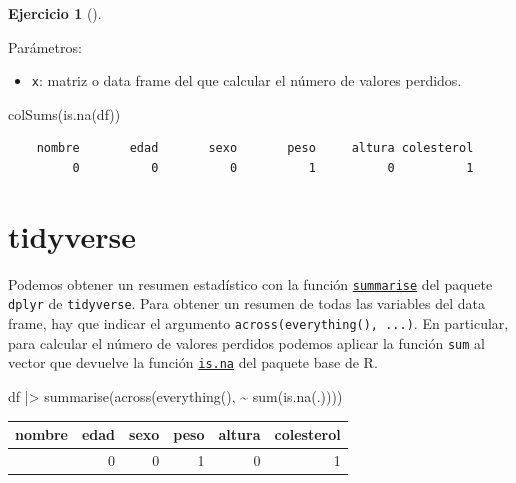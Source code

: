 \documentclass[
  spanish,
  a4paper,
]{scrreport}
\newenvironment{Shaded}{\begin{snugshade}}{\end{snugshade}}
\newcommand{\FunctionTok}[1]{\textcolor[rgb]{0.28,0.35,0.67}{#1}}
\newcommand{\NormalTok}[1]{\textcolor[rgb]{0.00,0.23,0.31}{#1}}
\newcommand{\SpecialCharTok}[1]{\textcolor[rgb]{0.37,0.37,0.37}{#1}}
\providecommand{\tightlist}{%
  \setlength{\itemsep}{0pt}\setlength{\parskip}{0pt}}
\theoremstyle{definition}
\newtheorem{exercise}{Ejercicio}[chapter]
\theoremstyle{remark}
\begin{document}
\begin{exercise}[]
\begin{enumerate}
\begin{tcolorbox}
  Parámetros:

  \begin{itemize}
  \tightlist
  \item
    \texttt{x}: matriz o data frame del que calcular el número de
    valores perdidos.
  \end{itemize}

\begin{Shaded}
\begin{Highlighting}[]
\FunctionTok{colSums}\NormalTok{(}\FunctionTok{is.na}\NormalTok{(df))}
\end{Highlighting}
\end{Shaded}

\begin{verbatim}
    nombre       edad       sexo       peso     altura colesterol 
         0          0          0          1          0          1 
\end{verbatim}

  \section{tidyverse}

  Podemos obtener un resumen estadístico con la función
  \href{https://dplyr.tidyverse.org/reference/summarise.html}{\texttt{summarise}}
  del paquete \texttt{dplyr} de \texttt{tidyverse}. Para obtener un
  resumen de todas las variables del data frame, hay que indicar el
  argumento \texttt{across(everything(),\ ...)}. En particular, para
  calcular el número de valores perdidos podemos aplicar la función
  \texttt{sum} al vector que devuelve la función
  \href{https://www.rdocumentation.org/packages/base/versions/3.6.2/topics/is.na}{\texttt{is.na}}
  del paquete base de R.

\begin{Shaded}
\begin{Highlighting}[]
\NormalTok{df }\SpecialCharTok{|\textgreater{}} \FunctionTok{summarise}\NormalTok{(}\FunctionTok{across}\NormalTok{(}\FunctionTok{everything}\NormalTok{(), }\SpecialCharTok{\textasciitilde{}} \FunctionTok{sum}\NormalTok{(}\FunctionTok{is.na}\NormalTok{(.))))}
\end{Highlighting}
\end{Shaded}

  \begin{longtable}[]{@{}rrrrrr@{}}
  \toprule\noalign{}
  nombre & edad & sexo & peso & altura & colesterol \\
  \midrule\noalign{}
  \endhead
  \bottomrule\noalign{}
  \endlastfoot
  0 & 0 & 0 & 1 & 0 & 1 \\
  \end{longtable}


\end{tcolorbox}
\end{enumerate}
\end{exercise}
\end{document}
